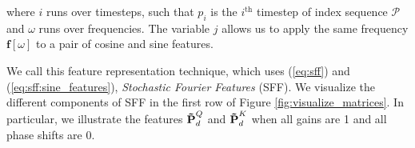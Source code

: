 where $i$ runs over timesteps, such that $p_i$ is the $i^{\text{th}}$ timestep of index sequence $\mathcal{P}$ and $\omega$ runs over frequencies. The variable $j$ allows us to apply the same frequency $\mathbf{f}[\omega]$ to a pair of cosine and sine features.

We call this feature representation technique, which uses (\ref{eq:sff}) and (\ref{eq:sff:sine_features}), \textit{Stochastic Fourier Features} (SFF). We visualize the different components of SFF in the first row of Figure \ref{fig:visualize_matrices}. In particular, we illustrate the features $\mathbf{\tilde{\text{$\mathbf{P}$}}}^Q_d$ and $\mathbf{\tilde{\text{$\mathbf{P}$}}}^K_d$ when all gains are 1 and all phase shifts are 0. 